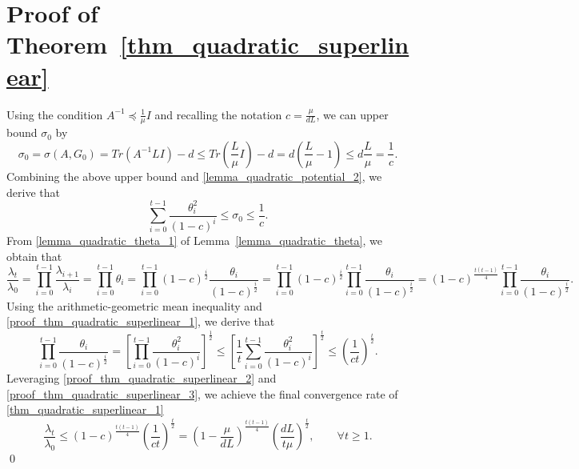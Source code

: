 \documentclass[11pt]{article}
\numberwithin{assumption}{section}
\numberwithin{remark}{section}
\numberwithin{theorem}{section}
\begin{document}
\section{Proof of Theorem~\ref{thm_quadratic_superlinear}}\label{sec:proof_of_thm_quadratic_superlinear}

Using the condition $A^{-1} \preceq \frac{1}{\mu}I$ and recalling the notation $c = \frac{\mu}{dL}$, we can upper bound $\sigma_0$ by
\begin{equation}
\sigma_0 = \sigma(A, G_0) = Tr(A^{-1}LI) - d \leq Tr(\frac{L}{\mu}I)- d = d(\frac{L}{\mu} - 1) \leq d\frac{L}{\mu} = \frac{1}{c}.
\end{equation}
Combining the above upper bound and \eqref{lemma_quadratic_potential_2}, we derive that
\begin{equation}\label{proof_thm_quadratic_superlinear_1}
\sum_{i = 0}^{t - 1}\frac{\theta^2_i}{(1 - c)^i} \leq \sigma_{0} \leq \frac{1}{c}.
\end{equation}
From \eqref{lemma_quadratic_theta_1} of Lemma~\ref{lemma_quadratic_theta}, we obtain that
\begin{equation}\label{proof_thm_quadratic_superlinear_2}
    \frac{\lambda_{t}}{\lambda_{0}} = \prod_{i = 0}^{t - 1}\frac{\lambda_{i + 1}}{\lambda_{i}} = \prod_{i = 0}^{t - 1}\theta_i = \prod_{i = 0}^{t - 1}(1 - c)^{\frac{i}{2}}\frac{\theta_i}{(1 - c)^{\frac{i}{2}}} = \prod_{i = 0}^{t - 1}(1 - c)^{\frac{i}{2}}\prod_{i = 0}^{t - 1}\frac{\theta_i}{(1 - c)^{\frac{i}{2}}} = (1 - c)^{\frac{t(t - 1)}{4}}\prod_{i = 0}^{t - 1}\frac{\theta_i}{(1 - c)^{\frac{i}{2}}}.
\end{equation}
Using the arithmetic-geometric mean inequality and \eqref{proof_thm_quadratic_superlinear_1}, we derive that
\begin{equation}\label{proof_thm_quadratic_superlinear_3}
    \prod_{i = 0}^{t - 1}\frac{\theta_i}{(1 - c)^{\frac{i}{2}}} = \left[\prod_{i = 0}^{t - 1}\frac{\theta^2_i}{(1 - c)^i}\right]^{\frac{1}{2}} \leq \left[\frac{1}{t}\sum_{i = 0}^{t - 1}\frac{\theta^2_i}{(1 - c)^i}\right]^{\frac{t}{2}} \leq \left(\frac{1}{ct}\right)^{\frac{t}{2}}.
\end{equation}
Leveraging \eqref{proof_thm_quadratic_superlinear_2} and \eqref{proof_thm_quadratic_superlinear_3}, we achieve the final convergence rate of \eqref{thm_quadratic_superlinear_1}
\begin{equation}
\frac{\lambda_{t}}{\lambda_{0}} \leq (1 - c)^{\frac{t(t - 1)}{4}}\left(\frac{1}{ct}\right)^{\frac{t}{2}} = (1 - \frac{\mu}{dL})^{\frac{t(t - 1)}{4}} (\frac{dL}{t\mu})^{\frac{t}{2}}, \qquad \forall t \geq 1.
\end{equation}\hfill \qed
\end{document}
